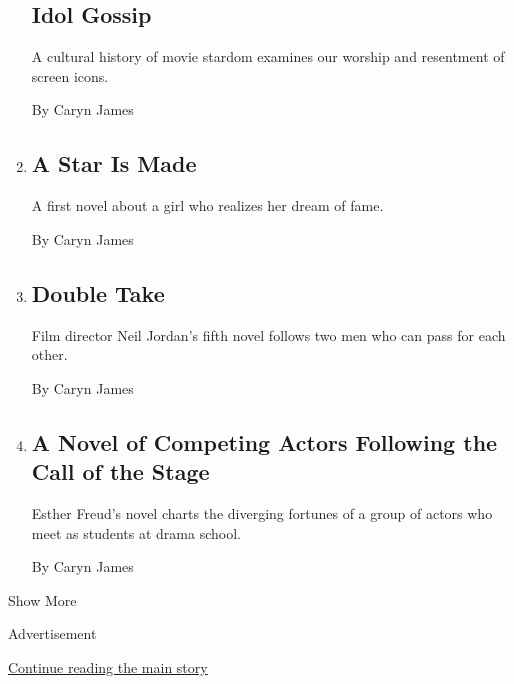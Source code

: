 \begin{enumerate}
  \hypertarget{idol-gossip}{%
  \subsection{Idol Gossip}\label{idol-gossip}}

  A cultural history of movie stardom examines our worship and
  resentment of screen icons.

  By Caryn James
\item
  \href{/2012/10/07/books/review/laura-lamonts-life-in-pictures-by-emma-straub.html}{}

  \hypertarget{a-star-is-made}{%
  \subsection{A Star Is Made}\label{a-star-is-made}}

  A first novel about a girl who realizes her dream of fame.

  By Caryn James
\item
  \href{/2012/02/05/books/review/film-director-neil-jordans-novel-mistaken.html}{}

  \hypertarget{double-take}{%
  \subsection{Double Take}\label{double-take}}

  Film director Neil Jordan's fifth novel follows two men who can pass
  for each other.

  By Caryn James
\item
  \href{/2011/10/30/books/review/lucky-break-by-esther-freud-book-review.html}{}

  \hypertarget{a-novel-of-competing-actors-following-the-call-of-the-stage}{%
  \subsection{A Novel of Competing Actors Following the Call of the
  Stage}\label{a-novel-of-competing-actors-following-the-call-of-the-stage}}

  Esther Freud's novel charts the diverging fortunes of a group of
  actors who meet as students at drama school.

  By Caryn James
\end{enumerate}

Show More

Advertisement

\protect\hyperlink{after-mid2}{Continue reading the main story}

